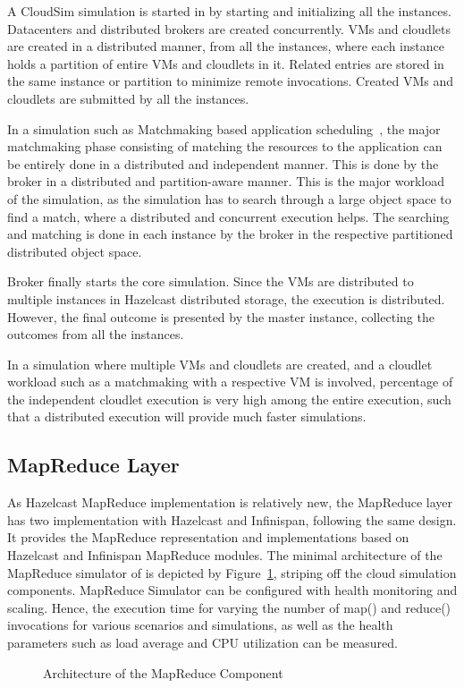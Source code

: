 A CloudSim simulation is started in  by starting and initializing all the instances. Datacenters and distributed brokers are created concurrently. VMs and cloudlets are created in a distributed manner, from all the instances, where each instance holds a partition of entire VMs and cloudlets in it. Related entries are stored in the same instance or partition to minimize remote invocations. Created VMs and cloudlets are submitted by all the instances.

In a simulation such as Matchmaking based application scheduling~\cite{mm,mm2}, the major matchmaking phase consisting of matching the resources to the application can be entirely done in a distributed and independent manner. This is done by the broker in a distributed and partition-aware manner. This is the major workload of the simulation, as the simulation has to search through a large object space to find a match, where a distributed and concurrent execution helps. The searching and matching is done in each instance by the broker in the respective partitioned distributed object space.

Broker finally starts the core simulation. Since the VMs are distributed to multiple instances in Hazelcast distributed storage, the execution is distributed. However, the final outcome is presented by the master instance, collecting the outcomes from all the instances.

In a simulation where multiple VMs and cloudlets are created, and a cloudlet workload such as a matchmaking with a respective VM is involved, percentage of the independent cloudlet execution is very high among the entire execution, such that a distributed execution will provide much faster simulations.


\subsection{MapReduce Layer}
As Hazelcast MapReduce implementation is relatively new, the MapReduce layer has two implementation with Hazelcast and Infinispan, following the same design. It provides the MapReduce representation and implementations based on Hazelcast and Infinispan MapReduce modules. The minimal architecture of the MapReduce simulator of  is depicted by Figure~\ref{fig:mapreduceImpl}, striping off the cloud simulation components. MapReduce Simulator can be configured with health monitoring and scaling. Hence, the execution time for varying the number of map() and reduce() invocations for various scenarios and simulations, as well as the health parameters such as load average and CPU utilization can be measured.
\begin{figure}[!htbp]
\begin{center}
\end{center}
 \caption{Architecture of the MapReduce Component}
 \label{fig:mapreduceImpl}
\end{figure}

